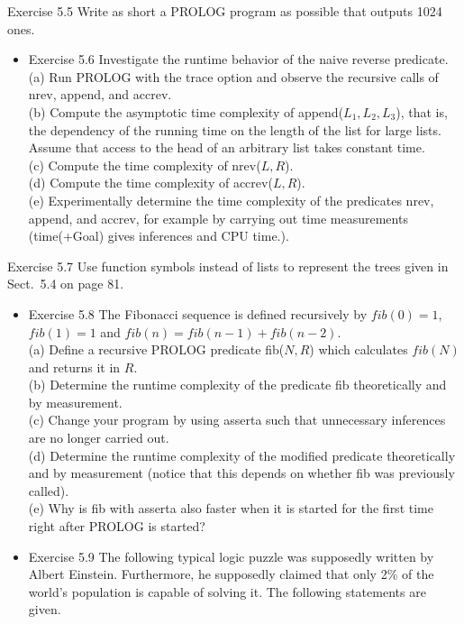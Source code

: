\documentclass[10pt]{book}
\begin{document}
Exercise 5.5 Write as short a PROLOG program as possible that outputs 1024 ones.

\begin{itemize}
  \item Exercise 5.6 Investigate the runtime behavior of the naive reverse predicate.\\
(a) Run PROLOG with the trace option and observe the recursive calls of nrev, append, and accrev.\\
(b) Compute the asymptotic time complexity of append($L_1,L_2,L_3$), that is, the dependency of the running time on the length of the list for large lists. Assume that access to the head of an arbitrary list takes constant time.\\
(c) Compute the time complexity of nrev($L,R$).\\
(d) Compute the time complexity of accrev($L,R$).\\
(e) Experimentally determine the time complexity of the predicates nrev, append, and accrev, for example by carrying out time measurements (time(+Goal) gives inferences and CPU time.).
\end{itemize}

Exercise 5.7 Use function symbols instead of lists to represent the trees given in Sect.\ 5.4 on page 81.

\begin{itemize}
  \item Exercise 5.8 The Fibonacci sequence is defined recursively by $fib(0)=1$, $fib(1)=1$ and $fib(n)=fib(n-1)+fib(n-2)$.\\
(a) Define a recursive PROLOG predicate fib($N,R$) which calculates $fib(N)$ and returns it in $R$.\\
(b) Determine the runtime complexity of the predicate fib theoretically and by measurement.\\
(c) Change your program by using asserta such that unnecessary inferences are no longer carried out.\\
(d) Determine the runtime complexity of the modified predicate theoretically and by measurement (notice that this depends on whether fib was previously called).\\
(e) Why is fib with asserta also faster when it is started for the first time right after PROLOG is started?
  \item Exercise 5.9 The following typical logic puzzle was supposedly written by Albert Einstein. Furthermore, he supposedly claimed that only 2\% of the world's population is capable of solving it. The following statements are given.
\end{itemize}
\end{document}
